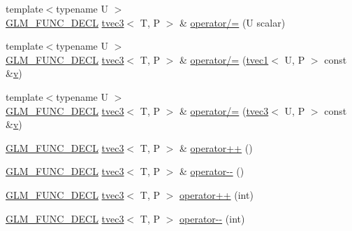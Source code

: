 \begin{DoxyCompactItemize}
\item 
{\footnotesize template$<$typename U $>$ }\\\mbox{\hyperlink{setup_8hpp_ab2d052de21a70539923e9bcbf6e83a51}{G\+L\+M\+\_\+\+F\+U\+N\+C\+\_\+\+D\+E\+CL}} \mbox{\hyperlink{structglm_1_1tvec3}{tvec3}}$<$ T, P $>$ \& \mbox{\hyperlink{structglm_1_1tvec3_a52731a1715cbe4886455e890ad958dc3}{operator/=}} (U scalar)
\item 
{\footnotesize template$<$typename U $>$ }\\\mbox{\hyperlink{setup_8hpp_ab2d052de21a70539923e9bcbf6e83a51}{G\+L\+M\+\_\+\+F\+U\+N\+C\+\_\+\+D\+E\+CL}} \mbox{\hyperlink{structglm_1_1tvec3}{tvec3}}$<$ T, P $>$ \& \mbox{\hyperlink{structglm_1_1tvec3_a05b1642c5a3b3be5a2bac556a06f3118}{operator/=}} (\mbox{\hyperlink{structglm_1_1tvec1}{tvec1}}$<$ U, P $>$ const \&\mbox{\hyperlink{glad_8h_a14cfbe2fc2234f5504618905b69d1e06}{v}})
\item 
{\footnotesize template$<$typename U $>$ }\\\mbox{\hyperlink{setup_8hpp_ab2d052de21a70539923e9bcbf6e83a51}{G\+L\+M\+\_\+\+F\+U\+N\+C\+\_\+\+D\+E\+CL}} \mbox{\hyperlink{structglm_1_1tvec3}{tvec3}}$<$ T, P $>$ \& \mbox{\hyperlink{structglm_1_1tvec3_a0e3c90e6a8dbab2102b88775942261d1}{operator/=}} (\mbox{\hyperlink{structglm_1_1tvec3}{tvec3}}$<$ U, P $>$ const \&\mbox{\hyperlink{glad_8h_a14cfbe2fc2234f5504618905b69d1e06}{v}})
\item 
\mbox{\hyperlink{setup_8hpp_ab2d052de21a70539923e9bcbf6e83a51}{G\+L\+M\+\_\+\+F\+U\+N\+C\+\_\+\+D\+E\+CL}} \mbox{\hyperlink{structglm_1_1tvec3}{tvec3}}$<$ T, P $>$ \& \mbox{\hyperlink{structglm_1_1tvec3_ac7d121d0cd2f4f53227be86b4c08289f}{operator++}} ()
\item 
\mbox{\hyperlink{setup_8hpp_ab2d052de21a70539923e9bcbf6e83a51}{G\+L\+M\+\_\+\+F\+U\+N\+C\+\_\+\+D\+E\+CL}} \mbox{\hyperlink{structglm_1_1tvec3}{tvec3}}$<$ T, P $>$ \& \mbox{\hyperlink{structglm_1_1tvec3_a61447785338db749ad3bdb5c97b8c710}{operator-\/-\/}} ()
\item 
\mbox{\hyperlink{setup_8hpp_ab2d052de21a70539923e9bcbf6e83a51}{G\+L\+M\+\_\+\+F\+U\+N\+C\+\_\+\+D\+E\+CL}} \mbox{\hyperlink{structglm_1_1tvec3}{tvec3}}$<$ T, P $>$ \mbox{\hyperlink{structglm_1_1tvec3_ab316ac7b6ea57d038e304dc43b9f3490}{operator++}} (int)
\item 
\mbox{\hyperlink{setup_8hpp_ab2d052de21a70539923e9bcbf6e83a51}{G\+L\+M\+\_\+\+F\+U\+N\+C\+\_\+\+D\+E\+CL}} \mbox{\hyperlink{structglm_1_1tvec3}{tvec3}}$<$ T, P $>$ \mbox{\hyperlink{structglm_1_1tvec3_abc0a890711331ebd0769c133824572bc}{operator-\/-\/}} (int)

\end{DoxyCompactItemize}
